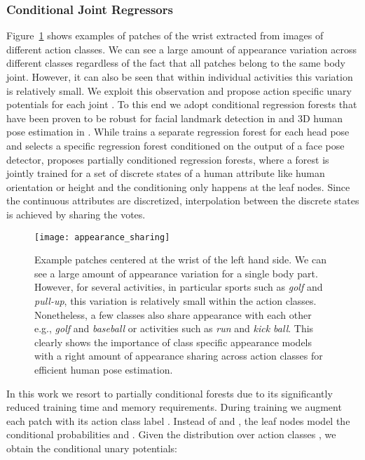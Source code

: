 \documentclass[a4paper, 10pt, conference]{ieeeconf}      \usepackage{FG2017}
\begin{document}
\subsubsection{Conditional Joint Regressors}\label{sec:cond_unary_potentials}
Figure~\ref{fig:appearance_sharing} shows examples of patches of the wrist extracted from images of different action classes. We can see a large amount of appearance variation across different classes regardless of the fact that all patches belong to the same body joint. However, it can also be seen that within individual activities this variation is relatively small. We exploit this observation and propose action specific unary potentials for each joint . To this end we adopt conditional regression forests \cite{dantone_cvpr2012, minsun_cvpr2012} that have been proven to be robust for facial landmark detection in \cite{dantone_cvpr2012} and 3D human pose estimation in \cite{minsun_cvpr2012}. 
While \cite{dantone_cvpr2012} trains a separate regression forest for each head pose and selects a specific regression forest conditioned on the output of a face pose detector, \cite{minsun_cvpr2012} proposes partially conditioned regression forests, where a forest is jointly trained for a set of discrete states of a human attribute like human orientation or height and the conditioning only happens at the leaf nodes. Since the continuous attributes are discretized, interpolation between the discrete states is achieved by sharing the votes. 


\begin{figure}[t!]
\texttt{[image: appearance\_sharing]}
\centering
\captionsetup[figure]{skip=0pt}
\caption{Example patches centered at the wrist of the left hand side. We can see a large amount of appearance variation for a single body part. However, for several activities, in particular sports such as \textit{golf} and \textit{pull-up}, this variation is relatively small within the action classes. Nonetheless, a few classes also share appearance with each other e.g., \textit{golf} and \textit{baseball} or activities such as \textit{run} and \textit{kick ball}. This clearly shows the importance of class specific appearance models with a right amount of appearance sharing across action classes for efficient human pose estimation.}
\label{fig:appearance_sharing}
\end{figure}

In this work we resort to partially conditional forests due to its significantly reduced training time and memory requirements. 
During training we augment each patch  with its action class label . Instead of  and , the leaf nodes model the conditional probabilities   and . Given the distribution over action classes , we obtain the conditional unary potentials:
\end{document}
